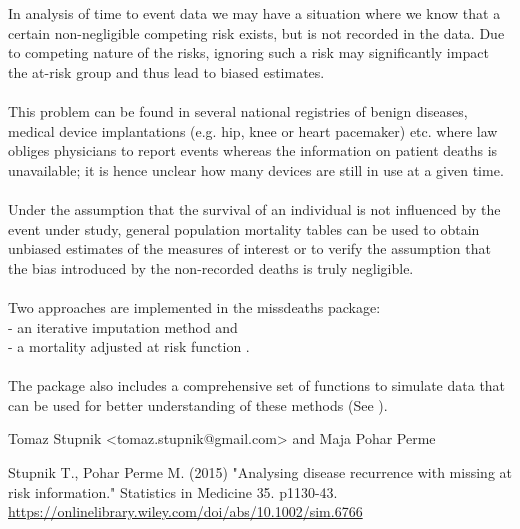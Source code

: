 \documentclass[a4paper]{book}
\begin{document}
%
\begin{Description}\relax
In analysis of time to event data we may have a situation where we know that a 
certain non-negligible competing risk exists, but is not recorded in the data. 
Due to competing nature of the risks, ignoring such a risk may significantly 
impact the at-risk group and thus lead to biased estimates. \\{}\\{}
This problem can be found in several national registries of benign diseases, 
medical device implantations (e.g. hip, knee or heart pacemaker) etc. where law obliges 
physicians to report events whereas the information on patient deaths is unavailable; 
it is hence unclear how many devices are still in use at a given time.\\{}\\{}
Under the assumption that the survival of an individual is not influenced by the 
event under study, general population mortality tables can be used to obtain unbiased 
estimates of the measures of interest or to verify the assumption that the bias
introduced by the non-recorded deaths is truly negligible.\\{}\\{}
Two approaches are implemented in the missdeaths package: \\{}
- an iterative imputation method  and\\{} 
- a mortality adjusted at risk function .\\{}\\{}
The package also includes a comprehensive set of functions to simulate data 
that can be used for better understanding of these methods (See ).
\end{Description}
%
\begin{Author}\relax
Tomaz Stupnik <tomaz.stupnik@gmail.com> and Maja Pohar Perme
\end{Author}
%
\begin{References}\relax
Stupnik T., Pohar Perme M. (2015) "Analysing disease recurrence
with missing at risk information." Statistics in Medicine 35. p1130-43.
\url{https://onlinelibrary.wiley.com/doi/abs/10.1002/sim.6766}
\end{References}
%
\end{document}
